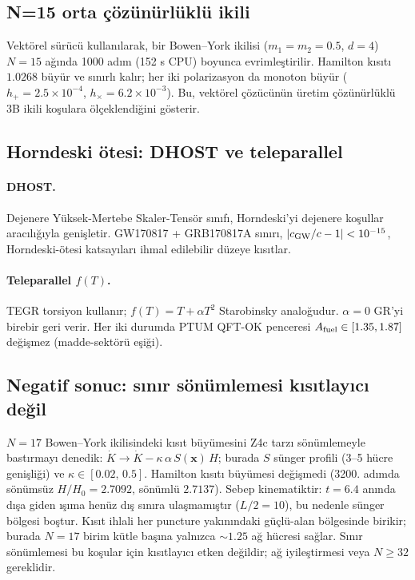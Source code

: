 \subsection{N=15 orta çözünürlüklü ikili}
Vektörel sürücü kullanılarak, bir Bowen--York ikilisi ($m_1 = m_2
= 0.5$, $d = 4$) $N = 15$ ağında 1000 adım (152 s CPU) boyunca
evrimleştirilir. Hamilton kısıtı $1.0268$ büyür ve sınırlı kalır;
her iki polarizasyon da monoton büyür ($h_+ = 2.5\times 10^{-4}$,
$h_\times = 6.2\times 10^{-3}$). Bu, vektörel çözücünün üretim
çözünürlüklü 3B ikili koşulara ölçeklendiğini gösterir.

\subsection{Horndeski ötesi: DHOST ve teleparallel}
\paragraph{DHOST.}
Dejenere Yüksek-Mertebe Skaler-Tensör sınıfı, Horndeski'yi
dejenere koşullar aracılığıyla genişletir. GW170817 + GRB170817A
sınırı, $|c_{\rm GW}/c - 1| < 10^{-15}$, Horndeski-ötesi
katsayıları ihmal edilebilir düzeye kısıtlar.
\paragraph{Teleparallel $f(T)$.}
TEGR torsiyon kullanır; $f(T) = T + \alpha T^2$ Starobinsky
analoğudur. $\alpha = 0$ GR'yi birebir geri verir.
Her iki durumda PTUM QFT-OK penceresi $A_{\rm fuel} \in [1.35,
1.87]$ değişmez (madde-sektörü eşiği).

\subsection{Negatif sonuc: sınır sönümlemesi kısıtlayıcı değil}

$N=17$ Bowen--York ikilisindeki kısıt büyümesini Z4c tarzı sönümlemeyle bastırmayı denedik: $\dot K \to \dot K - \kappa\,\alpha\,S(\mathbf{x})\,H$; burada $S$ sünger profili (3--5 hücre genişliği) ve $\kappa \in [0.02,\,0.5]$. Hamilton kısıtı büyümesi değişmedi (3200. adımda sönümsüz $H/H_0 = 2.7092$, sönümlü $2.7137$). Sebep kinematiktir: $t = 6.4$ anında dışa giden ışıma henüz dış sınıra ulaşmamıştır ($L/2 = 10$), bu nedenle sünger bölgesi boştur. Kısıt ihlali her puncture yakınındaki güçlü-alan bölgesinde birikir; burada $N=17$ birim kütle başına yalnızca $\sim 1.25$ ağ hücresi sağlar. Sınır sönümlemesi bu koşular için kısıtlayıcı etken değildir; ağ iyileştirmesi veya $N \ge 32$ gereklidir.

